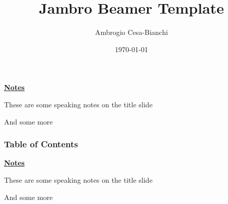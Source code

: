 \documentclass[10pt]{beamer}
\title[]{Jambro Beamer Template}
\author[]{Ambrogio Cesa-Bianchi}
\date{\today}
\begin{document}
\begin{frame}[plain]
\end{frame}
\begin{flushleft}
	\underline{\textbf{Notes}}\setlength{\parskip}{.15cm}\notesize\newline\par
	These are some speaking notes on the title slide \par
	And some more 
\end{flushleft}

\begin{frame}
    \frametitle{Table of Contents}
    \tableofcontents
\end{frame}
\begin{flushleft}
    \underline{\textbf{Notes}}\setlength{\parskip}{.15cm}\notesize\newline\par
    These are some speaking notes on the title slide \par
    And some more 
\end{flushleft}

\end{document}
